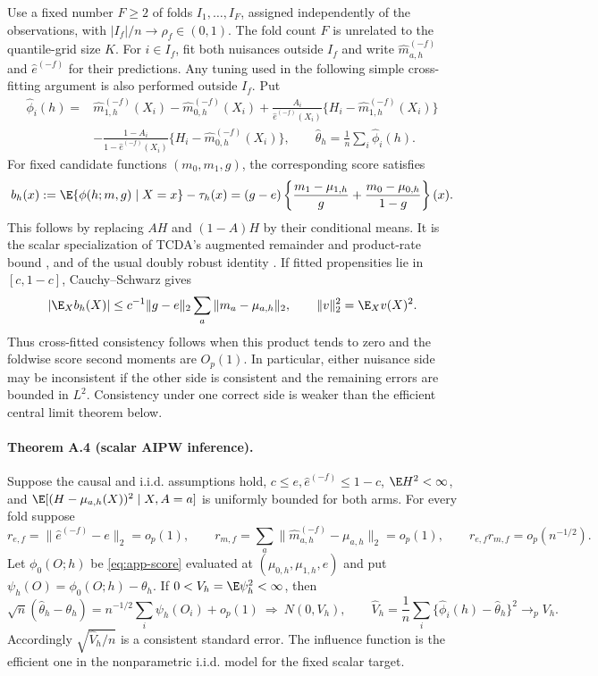 Use a fixed number $F\geq2$ of folds $I_1,\ldots,I_F$, assigned independently of the observations, with $|I_f|/n\to\rho_f\in(0,1)$. The fold count $F$ is unrelated to the quantile-grid size $K$. For $i\in I_f$, fit both nuisances outside $I_f$ and write $\widehat m_{a,h}^{(-f)}$ and $\widehat e^{(-f)}$ for their predictions. Any tuning used in the following simple cross-fitting argument is also performed outside $I_f$. Put
\begin{align}
 \widehat\phi_i(h)={}&\widehat m_{1,h}^{(-f)}(X_i)-\widehat m_{0,h}^{(-f)}(X_i)
 +\frac{A_i}{\widehat e^{(-f)}(X_i)}\{H_i-\widehat m_{1,h}^{(-f)}(X_i)\}\nonumber\\
 &-\frac{1-A_i}{1-\widehat e^{(-f)}(X_i)}\{H_i-\widehat m_{0,h}^{(-f)}(X_i)\},\qquad
 \widehat\theta_h=\frac1n\sum_i\widehat\phi_i(h).
 \label{eq:app-score}
\end{align}
For fixed candidate functions $(m_0,m_1,g)$, the corresponding score satisfies
\begin{equation}
 b_h(x):=\E\{\phi(h;m,g)\mid X=x\}-\tau_h(x)
 =(g-e)\left\{\frac{m_1-\mu_{1,h}}{g}+\frac{m_0-\mu_{0,h}}{1-g}\right\}(x).
 \label{eq:app-dr-bias}
\end{equation}
This follows by replacing $A H$ and $(1-A)H$ by their conditional means. It is the scalar specialization of TCDA's augmented remainder and product-rate bound \citep[Proposition 5.3]{souto_diamantis_tcda_2026}, and of the usual doubly robust identity \citep{bang2005doubly}. If fitted propensities lie in $[c,1-c]$, Cauchy--Schwarz gives
\[
 |\E_X b_h(X)|\leq c^{-1}\|g-e\|_2\sum_a\|m_a-\mu_{a,h}\|_2,
 \qquad \|v\|_2^2=\E_X v(X)^2.
\]
Thus cross-fitted consistency follows when this product tends to zero and the foldwise score second moments are $O_p(1)$. In particular, either nuisance side may be inconsistent if the other side is consistent and the remaining errors are bounded in $L^2$. Consistency under one correct side is weaker than the efficient central limit theorem below.

\paragraph{Theorem A.4 (scalar AIPW inference).}
Suppose the causal and i.i.d. assumptions hold, $c\leq e,\widehat e^{(-f)}\leq1-c$, $\E H^2<\infty$, and $\E[(H-\mu_{a,h}(X))^2\mid X,A=a]$ is uniformly bounded for both arms. For every fold suppose
\[
 r_{e,f}=\|\widehat e^{(-f)}-e\|_2=o_p(1),\qquad
 r_{m,f}=\sum_a\|\widehat m_{a,h}^{(-f)}-\mu_{a,h}\|_2=o_p(1),\qquad
 r_{e,f}r_{m,f}=o_p(n^{-1/2}).
\]
Let $\phi_0(O;h)$ be \eqref{eq:app-score} evaluated at $(\mu_{0,h},\mu_{1,h},e)$ and put $\psi_h(O)=\phi_0(O;h)-\theta_h$. If $0<V_h=\E\psi_h^2<\infty$, then
\begin{equation}
 \sqrt n(\widehat\theta_h-\theta_h)=n^{-1/2}\sum_i\psi_h(O_i)+o_p(1)
 \ \Longrightarrow\ N(0,V_h),\qquad
 \widehat V_h=\frac1n\sum_i\{\widehat\phi_i(h)-\widehat\theta_h\}^2\to_p V_h.
 \label{eq:app-clt}
\end{equation}
Accordingly $\sqrt{\widehat V_h/n}$ is a consistent standard error. The influence function is the efficient one in the nonparametric i.i.d. model for the fixed scalar target.

